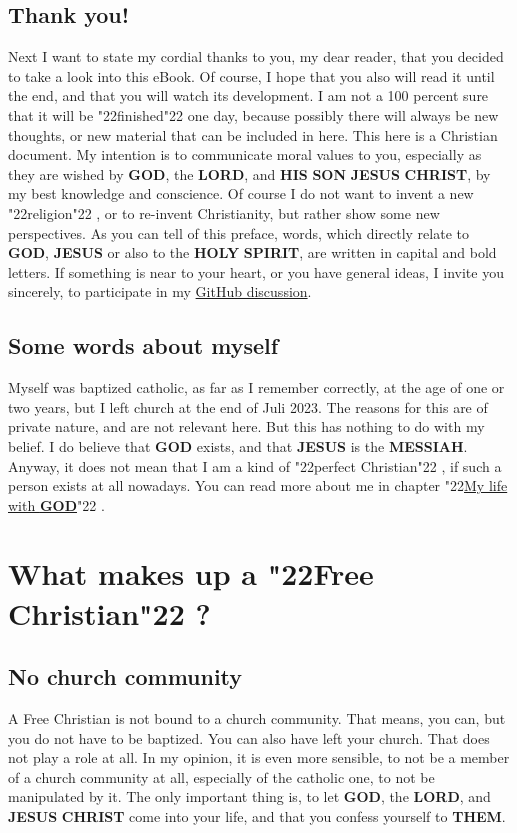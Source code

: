 \documentclass[12pt,a4paper]{article}
\newcommand{\Christ}[0]{\textbf{CHRIST}}
\newcommand{\God}[0]{\textbf{GOD}}
\newcommand{\His}[0]{\textbf{HIS}}
\newcommand{\Holy}[0]{\textbf{HOLY}}
\newcommand{\Jesus}[0]{\textbf{JESUS}}
\newcommand{\Lord}[0]{\textbf{LORD}}
\newcommand{\Messiah}[0]{\textbf{MESSIAH}}
\newcommand{\Son}[0]{\textbf{SON}}
\newcommand{\Spirit}[0]{\textbf{SPIRIT}}
\newcommand{\Them}[0]{\textbf{THEM}}
\newcommand{\q}[1]{\char"22{#1}\char"22 }
\begin{document}
	\subsection{Thank you!}
		Next I want to state my cordial thanks to you,
		my dear reader,
		that you decided to take a look into this eBook.
		Of course,
		I hope that you also will read it until the end,
		and that you will watch its development.
		I am not a 100 percent sure that it will be \q{finished} one day,
		because possibly there will always be new thoughts,
		or new material that can be included in here.
		This here is a Christian document.
		My intention is to communicate moral values to you,
		especially as they are wished by {\God}, the {\Lord},
		and {\His} {\Son} {\Jesus} {\Christ},
		by my best knowledge and conscience.
		Of course I do not want to invent a new \q{religion},
		or to re-invent Christianity,
		but rather show some new perspectives.
		As you can tell of this preface,
		words,
		which directly relate to {\God},
		{\Jesus} or also to the {\Holy} {\Spirit},
		are written in capital and bold letters.
		If something is near to your heart,
		or you have general ideas,
		I invite you sincerely,
		to participate in my  \href{https://github.com/DerRobert-28/Der-Freie-Christ/discussions}{GitHub discussion}.
	
	\subsection{Some words about myself}
		Myself was baptized catholic,
		as far as I remember correctly,
		at the age of one or two years,
		but I left church at the end of Juli 2023.
		The reasons for this are of private nature,
		and are not relevant here.
		But this has nothing to do with my belief.
		I do believe that {\God} exists,
		and that {\Jesus} is the {\Messiah}.
		Anyway,
		it does not mean that I am a kind of \q{perfect Christian},
		if such a person exists at all nowadays.
		You can read more about me in chapter \q{\hyperref[MeinLebenMitGott]{My life with {\God}}}.
	
	\newpage
	\section{What makes up a \q{Free Christian}?}
	
	\subsection{No church community}
		A Free Christian is not bound to a church community.
		That means,
		you can,
		but you do not have to be baptized.
		You can also have left your church.
		That does not play a role at all.
		In my opinion,
		it is even more sensible,
		to not be a member of a church community at all,
		especially of the catholic one,
		to not be manipulated by it.
		The only important thing is,
		to let {\God},
		the {\Lord},
		and {\Jesus} {\Christ} come into your life,
		and that you confess yourself to {\Them}.
	
\end{document}
